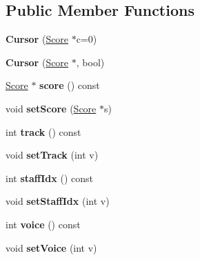 \subsection*{Public Member Functions}
\begin{DoxyCompactItemize}
\item 
\mbox{\label{class_ms_1_1_cursor_ac9d66b8a45415a9b53f1f81d1ec62389}} 
{\bfseries Cursor} (\hyperlink{class_ms_1_1_score}{Score} $\ast$c=0)
\item 
\mbox{\label{class_ms_1_1_cursor_a0a27aabf41a90569af543a34bd68dc87}} 
{\bfseries Cursor} (\hyperlink{class_ms_1_1_score}{Score} $\ast$, bool)
\item 
\mbox{\label{class_ms_1_1_cursor_a29a4d65b5943787fdd17058700eacbd9}} 
\hyperlink{class_ms_1_1_score}{Score} $\ast$ {\bfseries score} () const
\item 
\mbox{\label{class_ms_1_1_cursor_a36aeeb9fb0927d8e6ae64d465c0118be}} 
void {\bfseries set\+Score} (\hyperlink{class_ms_1_1_score}{Score} $\ast$s)
\item 
\mbox{\label{class_ms_1_1_cursor_a4c5a9a72a059689ac23a6f9fef67a0a2}} 
int {\bfseries track} () const
\item 
\mbox{\label{class_ms_1_1_cursor_ae19af733818a9bd65ce4768496a73bc6}} 
void {\bfseries set\+Track} (int v)
\item 
\mbox{\label{class_ms_1_1_cursor_a34b7de5149f6fa1b5cc180c8ffc38712}} 
int {\bfseries staff\+Idx} () const
\item 
\mbox{\label{class_ms_1_1_cursor_a49812e530394ebc19336f21a69233173}} 
void {\bfseries set\+Staff\+Idx} (int v)
\item 
\mbox{\label{class_ms_1_1_cursor_ac7cead79e2635a4d99082ec18d0c3dcb}} 
int {\bfseries voice} () const
\item 
\mbox{\label{class_ms_1_1_cursor_a0abf740ddf864982945cd4f1c390bd2f}} 
void {\bfseries set\+Voice} (int v)

\end{DoxyCompactItemize}
